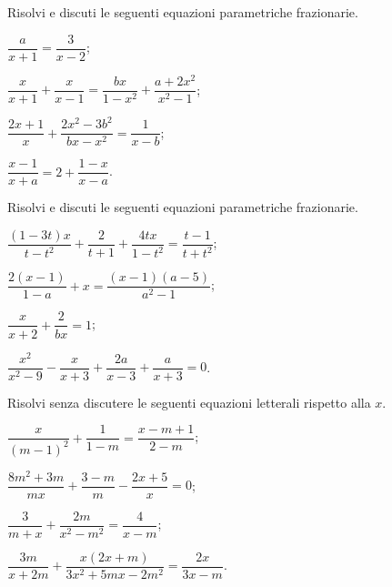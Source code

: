 \begin{esercizio}
\label{ese:19.20}
Risolvi e discuti le seguenti equazioni parametriche frazionarie.
\begin{multicols}{2}
\begin{enumeratea}
 \item $\dfrac{a}{x+1}=\dfrac{3}{x-2}$;
 \item $\dfrac{x}{x+1}+\dfrac{x}{x-1}=\dfrac{bx}{1-x^{2}}+\dfrac{a+2x^{2}}{x^{2}-1}$;
 \item $\dfrac{2x+1}{x}+\dfrac{2x^{2}-3b^{2}}{bx-x^{2}}=\dfrac{1}{x-b}$;
 \item $\dfrac{x-1}{x+a}=2+\dfrac{1-x}{x-a}$.
\end{enumeratea}
\end{multicols}
\end{esercizio}
\pagebreak
\begin{esercizio}[\Ast]
\label{ese:19.21}
Risolvi e discuti le seguenti equazioni parametriche frazionarie.
\begin{multicols}{2}
\begin{enumeratea}
 \item $\dfrac{(1-3t)x}{t-t^{2}}+\dfrac{2}{t+1}+\dfrac{4tx}{1-t^{2}}=\dfrac{t-1}{t+t^{2}}$;
 \item $\dfrac{2(x-1)}{1-a}+x=\dfrac{(x-1)(a-5)}{a^{2}-1}$;
 \item $\dfrac{x}{x+2}+\dfrac{2}{bx}=1$;
 \item $\dfrac{x^{2}}{x^{2}-9}-\dfrac{x}{x+3}+\dfrac{2a}{x-3}+\dfrac{a}{x+3}=0$.
\end{enumeratea}
\end{multicols}
\end{esercizio}

\begin{esercizio}[\Ast]
\label{ese:19.22}
Risolvi senza discutere le seguenti equazioni letterali rispetto alla $x$.
\begin{multicols}{2}
\begin{enumeratea}
 \item $\dfrac{x}{(m-1)^{2}}+\dfrac{1}{1-m}=\dfrac{x-m+1}{2-m}$;
 \item $\dfrac{8m^{2}+3m}{mx}+\dfrac{3-m}{m}-\dfrac{2x+5}{x}=0$;
 \item $\dfrac{3}{m+x}+\dfrac{2m}{x^{2}-m^{2}}=\dfrac{4}{x-m}$;
 \item $\dfrac{3m}{x+2m}+\dfrac{x(2x+m)}{3x^{2}+5mx-2m^{2}}=\dfrac{2x}{3x-m}$.
\end{enumeratea}
\end{multicols}
\end{esercizio}

